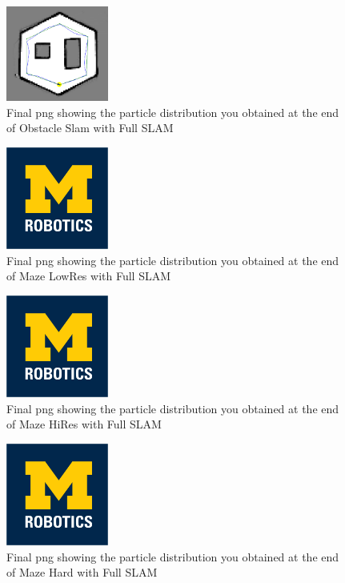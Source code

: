 \documentclass[journal,twocolumn]{IEEEtran}
\begin{document}
\begin{figure}[H]
\centering
\includegraphics[width=0.3\textwidth]{Media/131.png}
\caption{Final png showing the particle distribution you obtained at the end of Obstacle Slam with Full SLAM}
\end{figure}

\begin{figure}[H]
\centering
\includegraphics[width=0.3\textwidth]{Media/template-robotics.jpg}
\caption{Final png showing the particle distribution you obtained at the end of Maze LowRes with Full SLAM}
\end{figure}

\begin{figure}[H]
\centering
\includegraphics[width=0.3\textwidth]{Media/template-robotics.jpg}
\caption{Final png showing the particle distribution you obtained at the end of Maze HiRes with Full SLAM}
\end{figure}

\begin{figure}[H]
\centering
\includegraphics[width=0.3\textwidth]{Media/template-robotics.jpg}
\caption{Final png showing the particle distribution you obtained at the end of Maze Hard with Full SLAM}
\end{figure}
\end{document}
